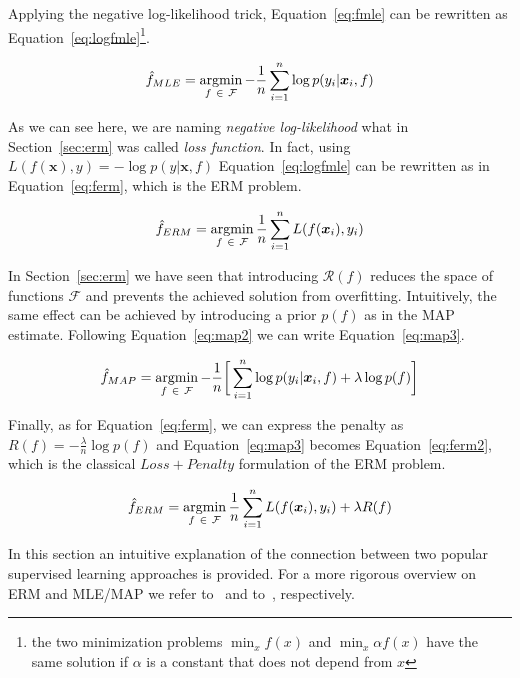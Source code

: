 Applying the negative log-likelihood trick, Equation~\eqref{eq:fmle} can be rewritten as Equation~\eqref{eq:logfmle}\footnote{the two minimization problems $\min_x f(x)$ and $\min_x \alpha f(x)$ have the same solution if $\alpha$ is a constant that does not depend from $x$}.

\begin{equation} \label{eq:logfmle}
	\hat f_{MLE} = \mathop{\mathrm{argmin}}\limits_{f~\in~\mathcal{F}} - \frac{1}{n} \sum_{i=1}^n \log p(y_i|\bm{x}_i,f)
\end{equation}

As we can see here, we are naming \textit{negative log-likelihood} what in Section~\ref{sec:erm} was called \textit{loss function}. In fact, using $L(f(\bm{x}), y) = -\log p(y|\bm{x}, f)$ Equation~\eqref{eq:logfmle} can be rewritten as in Equation~\eqref{eq:ferm}, which is the ERM problem.

\begin{equation} \label{eq:ferm}
	\hat f_{ERM} = \mathop{\mathrm{argmin}}\limits_{f~\in~\mathcal{F}} \frac{1}{n} \sum_{i=1}^n L(f(\bm{x}_i), y_i)
\end{equation}

In Section~\ref{sec:erm} we have seen that introducing $\mathcal{R}(f)$ reduces the space of functions $\mathcal{F}$ and prevents the achieved solution from overfitting. Intuitively, the same effect can be achieved by introducing a prior $p(f)$ as in the MAP estimate. Following Equation~\eqref{eq:map2} we can write Equation~\eqref{eq:map3}.

\begin{equation} \label{eq:map3}
	\hat f_{MAP} = \mathop{\mathrm{argmin}}\limits_{f~\in~\mathcal{F}} - \frac{1}{n} \bigg[ \sum_{i=1}^n \log p(y_i|\bm{x}_i,f) + \lambda \log p(f) \bigg]
\end{equation}

Finally, as for Equation~\eqref{eq:ferm}, we can express the penalty as $R(f) = - \frac{\lambda}{n} \log p(f)$ and Equation~\eqref{eq:map3} becomes Equation~\eqref{eq:ferm2}, which is the classical $Loss + Penalty$ formulation of the ERM problem.

\begin{equation} \label{eq:ferm2}
	\hat f_{ERM} = \mathop{\mathrm{argmin}}\limits_{f~\in~\mathcal{F}} \frac{1}{n} \sum_{i=1}^n L(f(\bm{x}_i), y_i) + \lambda R(f)
\end{equation}

In this section an intuitive explanation of the connection between two popular supervised learning approaches is provided. For a more rigorous overview on ERM and MLE/MAP we refer to~\cite{hastie2009elements} and to~\cite{rasmussen2006gaussian}, respectively.

